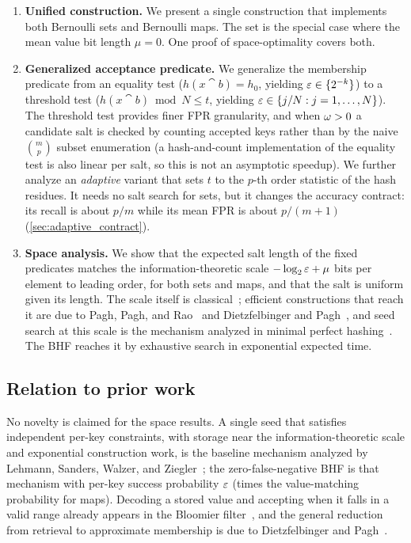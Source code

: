 \begin{enumerate}
    \item \textbf{Unified construction.}
    We present a single construction that implements both Bernoulli sets and
    Bernoulli maps.
    The set is the special case where the mean value bit length $\mu = 0$.
    One proof of space-optimality covers both.

    \item \textbf{Generalized acceptance predicate.}
    We generalize the membership predicate from an equality test
    ($h(x \cat b) = h_0$, yielding $\varepsilon \in \{2^{-k}\}$) to a threshold
    test ($h(x \cat b) \bmod N \leq t$, yielding
    $\varepsilon \in \{j/N : j = 1,\ldots,N\}$).
    The threshold test provides finer FPR granularity, and when
    $\omega > 0$ a candidate salt is checked by counting accepted keys
    rather than by the naive $\binom{m}{p}$ subset enumeration (a
    hash-and-count implementation of the equality test is also linear per
    salt, so this is not an asymptotic speedup).
    We further analyze an \emph{adaptive} variant that sets $t$ to the
    $p$-th order statistic of the hash residues.
    It needs no salt search for sets, but it changes the accuracy contract:
    its recall is about $p/m$ while its mean FPR is about $p/(m+1)$
    (\cref{sec:adaptive_contract}).

    \item \textbf{Space analysis.}
    We show that the expected salt length of the fixed predicates matches the
    information-theoretic scale $-\log_2 \varepsilon + \mu$ bits per element to
    leading order, for both sets and maps, and that the salt is uniform given
    its length.
    The scale itself is classical~\cite{carter1978,pagh2001lossy};
    efficient constructions that reach it are due to Pagh, Pagh, and
    Rao~\cite{pagh2005} and Dietzfelbinger and Pagh~\cite{dietzfelbinger2008retrieval},
    and seed search at this scale is the mechanism analyzed in minimal
    perfect hashing~\cite{esposito2020recsplit,lehmann2024shockhash,lehmann2025seeds}.
    The BHF reaches it by exhaustive search in exponential expected time.
\end{enumerate}

\subsection*{Relation to prior work}

No novelty is claimed for the space results.
A single seed that satisfies independent per-key constraints, with storage
near the information-theoretic scale and exponential construction work, is
the baseline mechanism analyzed by Lehmann, Sanders, Walzer, and
Ziegler~\cite[Sec.~1.1]{lehmann2025seeds}; the zero-false-negative BHF is that
mechanism with per-key success probability $\varepsilon$ (times the
value-matching probability for maps).
Decoding a stored value and accepting when it falls in a valid range already
appears in the Bloomier filter~\cite{chazelle2004bloomier}, and the general
reduction from retrieval to approximate membership is due to Dietzfelbinger
and Pagh~\cite{dietzfelbinger2008retrieval}.

